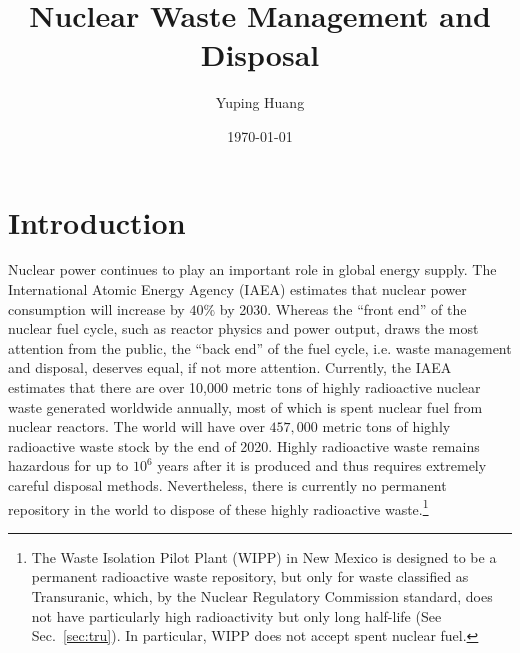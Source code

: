 \documentclass[nofootinbib,preprint,aps]{revtex4-1}
\begin{document}
\title{Nuclear Waste Management and Disposal}

\author{Yuping Huang}%

\date{\today}%
\begin{abstract}
\end{abstract}
\maketitle
\tableofcontents
\newpage
\section{Introduction}
Nuclear power continues to play an important role in global energy supply.
The International Atomic Energy Agency (IAEA) estimates that nuclear power
consumption will increase by $40\%$ by 2030.\cite{iaea12}
Whereas the ``front end'' of the nuclear fuel cycle, such as reactor physics and power output, draws
the most attention from the public, the ``back end'' of the fuel cycle, i.e. waste management and
disposal, deserves equal, if not more attention.
Currently, the IAEA estimates that there are over 10,000 metric tons of highly radioactive nuclear waste 
generated worldwide annually,
most of which is spent nuclear fuel from nuclear reactors.\cite{iaea08, r12}
The world will have over $457,000$ metric tons of highly radioactive waste stock by the end of 2020.\cite{r12}
Highly radioactive waste remains hazardous for up to $10^6$ years after it is produced and thus
requires extremely careful disposal methods.
Nevertheless, there is currently no permanent repository in the world to dispose of these highly radioactive
waste.\footnote{The Waste Isolation Pilot Plant (WIPP) in New Mexico is designed to be a permanent radioactive
    waste repository, but only
for waste classified as Transuranic, which, by the Nuclear Regulatory Commission standard, does not have particularly
high radioactivity but only long half-life (See Sec.~\ref{sec:tru}). In particular, WIPP does not accept spent nuclear
fuel.}  
\end{document}
